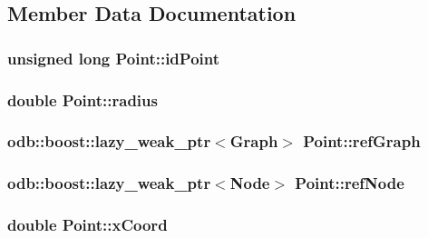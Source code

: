 \subsection{Member Data Documentation}
\hypertarget{class_point_ad403ab7101778e018300ebc141d220d8}{}
\subsubsection[{id\+Point}]{\setlength{\rightskip}{0pt plus 5cm}unsigned long Point\+::id\+Point\hspace{0.3cm}{\ttfamily [private]}}\label{class_point_ad403ab7101778e018300ebc141d220d8}
\hypertarget{class_point_af4f987f16754db370e5d1b3d1bf1fd52}{}
\subsubsection[{radius}]{\setlength{\rightskip}{0pt plus 5cm}double Point\+::radius\hspace{0.3cm}{\ttfamily [private]}}\label{class_point_af4f987f16754db370e5d1b3d1bf1fd52}
\hypertarget{class_point_aaa2cf5c9426e449b779601807bffad85}{}
\subsubsection[{ref\+Graph}]{\setlength{\rightskip}{0pt plus 5cm}odb\+::boost\+::lazy\+\_\+weak\+\_\+ptr$<${\bf Graph}$>$ Point\+::ref\+Graph\hspace{0.3cm}{\ttfamily [private]}}\label{class_point_aaa2cf5c9426e449b779601807bffad85}
\hypertarget{class_point_a9f3b1208b4f3000d5a44503dd4374e4a}{}
\subsubsection[{ref\+Node}]{\setlength{\rightskip}{0pt plus 5cm}odb\+::boost\+::lazy\+\_\+weak\+\_\+ptr$<${\bf Node}$>$ Point\+::ref\+Node\hspace{0.3cm}{\ttfamily [private]}}\label{class_point_a9f3b1208b4f3000d5a44503dd4374e4a}
\hypertarget{class_point_a88cdf9735cc89d2703e90d087a85629a}{}
\subsubsection[{x\+Coord}]{\setlength{\rightskip}{0pt plus 5cm}double Point\+::x\+Coord\hspace{0.3cm}{\ttfamily [private]}}\label{class_point_a88cdf9735cc89d2703e90d087a85629a}
\hypertarget{class_point_a47f5bf493a270e35fd80b96422469b6d}{}
